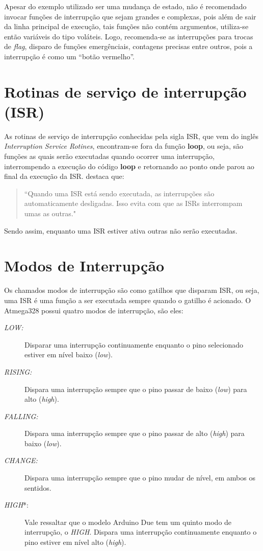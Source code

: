\documentclass[a4paper,12pt,portuguese]{ufms-cpcx}
\begin{document}
Apesar do exemplo utilizado ser uma mudança de estado, não é recomendado invocar funções de interrupção que sejam grandes e complexas, pois além de sair da linha principal de execução, tais funções não contém argumentos, utiliza-se então variáveis do tipo voláteis. Logo, recomenda-se as interrupções para trocas de \textit{flag}, disparo de funções emergênciais, contagens precisas entre outros, pois a interrupção é como um ``botão vermelho''.

\section{Rotinas de serviço de interrupção (ISR)}\label{isr}
As rotinas de serviço de interrupção conhecidas pela sigla ISR, que vem do inglês \textit{Interruption Service Rotines}, encontram-se fora da função \textbf{loop}, ou seja, são funções as quais serão executadas quando ocorrer uma interrupção, interrompendo a execução do código \textbf{loop} e retornando ao ponto onde parou ao final da execução da ISR.  destaca que:
\begin{quote}``Quando uma ISR está sendo executada, as interrupções são automaticamente desligadas. Isso evita com que as ISRs interrompam umas as outras."\end{quote}

Sendo assim, enquanto uma ISR estiver ativa outras não serão executadas.

\section{Modos de Interrupção}\label{modointerrupcao}
Os chamados modos de interrupção são como gatilhos que disparam ISR, ou seja, uma ISR é uma função a ser executada sempre quando o gatilho é acionado. O Atmega328 possui quatro modos de interrupção, são eles: \\
\begin{description}
	\item[\textit{LOW:}] Disparar uma interrupção continuamente enquanto o pino selecionado estiver em nível baixo (\textit{low}).
	\item[\textit{RISING:}] Dispara uma interrupção sempre que o pino passar de baixo (\textit{low}) para alto (\textit{high}).
	\item[\textit{FALLING:}] Dispara uma interrupção sempre que o pino passar de alto (\textit{high}) para baixo (\textit{low}).
	\item[\textit{CHANGE:}] Dispara uma interrupção sempre que o pino mudar de nível, em ambos os sentidos. 
	\item[\textit{HIGH}*:] Vale ressaltar que o modelo Arduino Due tem um quinto modo de interrupção, o \textit{HIGH}. Dispara uma interrupção continuamente enquanto o pino estiver em nível alto (\textit{high}).
\end{description}
\end{document}

